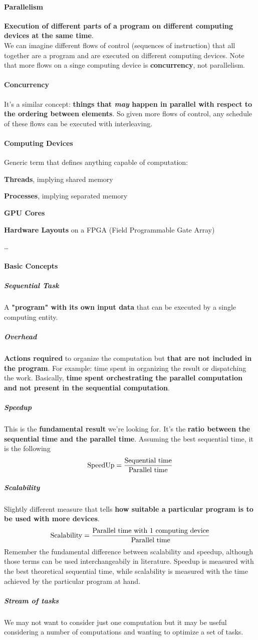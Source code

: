 \documentclass[10pt]{report}
\begin{document}
\paragraph{Parallelism} \textbf{Execution of different parts of a program on different computing devices at the same time}.\\
We can imagine different flows of control (sequences of instruction) that all together are a program and are executed on different computing devices. Note that more flows on a singe computing device is \textbf{concurrency}, not parallelism.
\paragraph{Concurrency} It's a similar concept: \textbf{things that \textit{may} happen in parallel with respect to the ordering between elements}. So given more flows of control, any schedule of these flows can be executed with interleaving.
\paragraph{Computing Devices} Generic term that defines anything capable of computation:\begin{list}{}{}
	\item \textbf{Threads}, implying shared memory
	\item \textbf{Processes}, implying separated memory
	\item \textbf{GPU Cores}
	\item \textbf{Hardware Layouts} on a FPGA (Field Programmable Gate Array)
	\item \ldots
\end{list}
\paragraph{Basic Concepts}
\subparagraph{Sequential Task} A \textbf{"program" with its own input data} that can be executed by a single computing entity.
\subparagraph{Overhead} \textbf{Actions required} to organize the computation but \textbf{that are not included in the program}. For example: time spent in organizing the result or dispatching the work. Basically, \textbf{time spent orchestrating the parallel computation and not present in the sequential computation}.
\subparagraph{Speedup} This is the \textbf{fundamental result} we're looking for. It's the \textbf{ratio between the sequential time and the parallel time}. Assuming the best sequential time, it is the following
$$\hbox{SpeedUp} = \frac{\hbox{Sequential time}}{\hbox{Parallel time}}$$
\subparagraph{Scalability} Slightly different measure that tells \textbf{how suitable a particular program is to be used with more devices}.
$$\hbox{Scalability}=\frac{\hbox{Parallel time with 1 computing device}}{\hbox{Parallel time}}$$
Remember the fundamental difference between scalability and speedup, although those terms can be used interchangeabily in literature. Speedup is measured with the best theoretical sequential time, while scalability is measured with the time achieved by the particular program at hand.
\subparagraph{Stream of tasks} We may not want to consider just one computation but it may be useful considering a number of computations and wanting to optimize a set of tasks.
\end{document}
